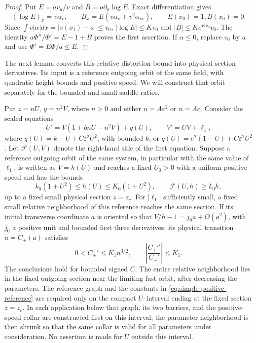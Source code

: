 \begin{proof}
Put $E=av_a/v$ and $B=a\partial_a\log E$.  Exact differentiation gives
\[
 (\log E)_x=v\alpha_v,\qquad
 B_x=E(v\alpha_v+v^2\alpha_{vv}),\qquad E(x_0)=1, B(x_0)=0.
\]
Since $\int v|\alpha|dx=|v(x_1)-a|\le v_0$,
$|\log E|\le Kv_0$ and $|B|\le Ke^{Kv_0}v_0$.
The identity $a\Phi''/\Phi'=E-1+B$ proves the first assertion.
If $\alpha\le0$, replace $v_0$ by $a$ and use
$\Phi'=E\Phi/a\le E$.
\end{proof}

The next lemma converts this relative distortion bound into physical
section derivatives. Its input is a reference outgoing orbit of the
same field, with quadratic height bounds and positive speed. We will
construct that orbit separately for the bounded and small saddle ratios.

\begin{lemma}\label{lem:positive-transition}
Put $z=nU$, $y=n^2V$, where $n>0$ and either
$n=A\varepsilon^2$ or $n=Ac$.
Consider the scaled equations
\begin{equation}\label{eq:simple-positive-scaled}
 U'=V(1+bnU-n^2V)+q(U),\qquad V'=UV+\ell_1,
\end{equation}
where $q(U)=k-U+C\varepsilon^2U^2$, with bounded $k$, or
$q(U)=e^2(1-U)+C\varepsilon^2U^2$.
Let $\mathcal F(U,V)$ denote the right-hand side of the first
equation. Suppose a reference outgoing orbit of the same system, in
particular with the same value of $\ell_1$, is written as $V=h(U)$ and
reaches a fixed $U_0>0$ with a uniform positive speed and has the bounds
\begin{equation}\label{eq:simple-positive-reference}
 k_0(1+U^2)\le h(U)\le K_0(1+U^2),\qquad
 \mathcal F(U,h)\ge k_0h,
\end{equation}
up to a fixed small physical section $z=z_c$.
For $|\ell_1|$ sufficiently small, a fixed small relative neighborhood
of this reference reaches the same section.  If its initial transverse
coordinate $a$ is oriented so that
$V/h-1=j_0a+O(a^2)$, with $j_0$ a positive unit and bounded first
three derivatives, its physical transition $u=C_+(a)$ satisfies
\begin{equation}\label{eq:simple-positive-jets}
 0<C_+'\le K_1 n^{3/2},\qquad
 \left|\frac{C_+''}{C_+'}\right|\le K_1.
\end{equation}
The conclusions hold for bounded signed $C$.  The entire relative
neighborhood lies in the fixed outgoing section near the limiting fast
orbit, after decreasing the parameters.
The reference graph and the constants in
\eqref{eq:simple-positive-reference} are required only on the compact
$U$--interval ending at the fixed section $z=z_c$.  In each application
below that graph, its two barriers, and the positive-speed collar are
constructed first on this interval; the parameter neighborhood is then
shrunk so that the same collar is valid for all parameters under
consideration.  No assertion is made for $U$ outside this interval.
\end{lemma}

